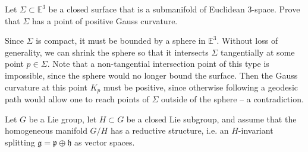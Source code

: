 \documentclass{../../templates/lkx_pset}
\begin{document}
\begin{problem}{4}
  Let $\Sigma\subset\mathbb{E}^3$ be a closed surface that is a submanifold of Euclidean $3$-space. Prove that $\Sigma$ has a point of positive Gauss curvature.
\end{problem}
\begin{solution}
  Since $\Sigma$ is compact, it must be bounded by a sphere in $\mathbb{E}^3$. Without loss of generality, we can shrink the sphere so that it intersects $\Sigma$ tangentially at some point $p\in \Sigma$. Note that a non-tangential intersection point of this type is impossible, since the sphere would no longer bound the surface. Then the Gauss curvature at this point $K_p$ must be positive, since otherwise following a geodesic path would allow one to reach points of $\Sigma$ outside of the sphere -- a contradiction.
\end{solution}

\begin{problem}{5}
Let $G$ be a Lie group, let $H\subset G$ be a closed Lie subgroup, and assume that the homogeneous manifold $G/H$ has a reductive structure, i.e. an $H$-invariant splitting $\mathfrak{g}=\mathfrak{p}\oplus\mathfrak{h}$ as vector spaces.
\end{problem}
\end{document}

